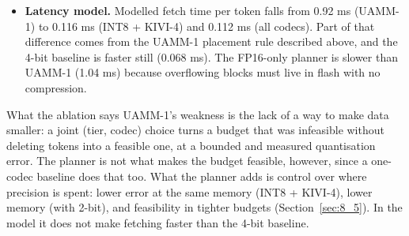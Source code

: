 \documentclass[12pt,a4paper]{report}
\begin{document}
\begin{itemize}
\item \textbf{Latency model.} Modelled fetch time per token falls from 0.92 ms (UAMM-1) to 0.116 ms (INT8 + KIVI-4) and 0.112 ms (all codecs). Part of that difference comes from the UAMM-1 placement rule described above, and the 4-bit baseline is faster still (0.068 ms). The FP16-only planner is slower than UAMM-1 (1.04 ms) because overflowing blocks must live in flash with no compression.
\end{itemize}
\begin{calloutbox}{What the ablation says}
UAMM-1's weakness is the lack of a way to make data smaller: a joint (tier, codec) choice turns a budget that was infeasible without deleting tokens into a feasible one, at a bounded and measured quantisation error. The planner is not what makes the budget feasible, however, since a one-codec baseline does that too. What the planner adds is control over where precision is spent: lower error at the same memory (INT8 + KIVI-4), lower memory (with 2-bit), and feasibility in tighter budgets (Section~\ref{sec:8_5}). In the model it does not make fetching faster than the 4-bit baseline.

\end{calloutbox}
\end{document}
